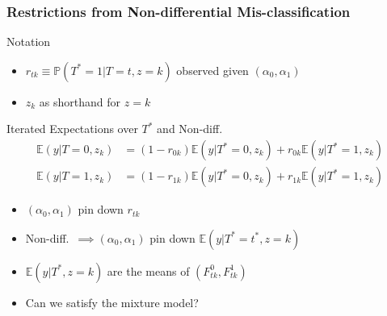 \documentclass{beamer}
\begin{document}
\begin{frame}[plain,t]
  \frametitle{Restrictions from Non-differential Mis-classification}


  \footnotesize

  \begin{block}{Notation}
    \begin{itemize}
      \item $r_{tk} \equiv \mathbb{P}(T^*=1|T=t,z=k)$ observed given $(\alpha_0, \alpha_1)$ 
      \item $z_k$ as shorthand for $z =k$\\
    \end{itemize}
  \end{block}

  \begin{block}{Iterated Expectations over $T^*$ and Non-diff.}
    \vspace{-1em}
  \begin{align*}
    \mathbb{E}(y|T=0,z_k) &= (1 - r_{0k})\mathbb{E}(y|T^*=0,z_k) + r_{0k} \mathbb{E}(y|T^*=1,z_k)\\
    \mathbb{E}(y|T=1,z_k) &= (1 - r_{1k}) \mathbb{E}(y|T^*=0,z_k) + r_{1k}\mathbb{E}(y|T^*=1,z_k)
  \end{align*}

  \vspace{1em}

  \begin{itemize}
    \item $(\alpha_0, \alpha_1)$ pin down $r_{tk}$
    \item Non-diff.\ $\implies (\alpha_0, \alpha_1)$ pin down $\mathbb{E}(y|T^*=t^*,z=k)$
    \item $\mathbb{E}(y|T^*,z=k)$ are the means of $(F^0_{tk}, F^{1}_{tk})$
    \item \alert{Can we satisfy the mixture model?}
  \end{itemize}
  \end{block}


\end{frame}
\end{document}
